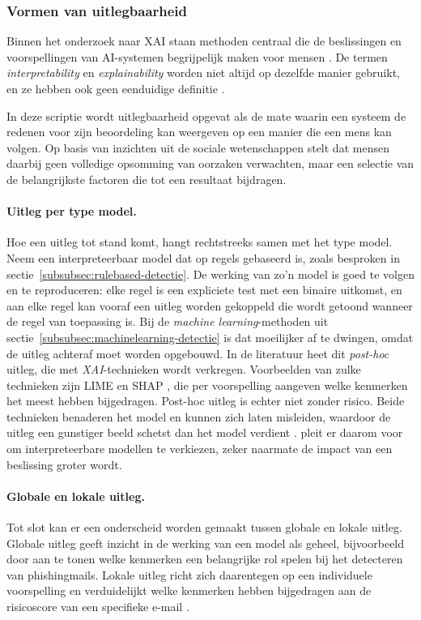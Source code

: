 \subsubsection{Vormen van uitlegbaarheid}
\label{subsubsec:vormen-van-uitlegbaarheid}

Binnen het onderzoek naar XAI staan methoden centraal die de beslissingen en voorspellingen van AI-systemen begrijpelijk maken voor mensen \autocite{Miller2017}. De termen \emph{interpretability} en \emph{explainability} worden niet altijd op dezelfde manier gebruikt, en ze hebben ook geen eenduidige definitie \autocite{Lipton2016}. 

In deze scriptie wordt uitlegbaarheid opgevat als de mate waarin een systeem de redenen voor zijn beoordeling kan weergeven op een manier die een mens kan volgen. Op basis van inzichten uit de sociale wetenschappen stelt \textcite{Miller2017} dat mensen daarbij geen volledige opsomming van oorzaken verwachten, maar een selectie van de belangrijkste factoren die tot een resultaat bijdragen.

\paragraph{Uitleg per type model.}
Hoe een uitleg tot stand komt, hangt rechtstreeks samen met het type model. Neem een interpreteerbaar model dat op regels gebaseerd is, zoals besproken in sectie~\ref{subsubsec:rulebased-detectie}. De werking van zo'n model is goed te volgen en te reproduceren: elke regel is een expliciete test met een binaire uitkomst, en aan elke regel kan vooraf een uitleg worden gekoppeld die wordt getoond wanneer de regel van toepassing is. Bij de \emph{machine learning}-methoden uit sectie~\ref{subsubsec:machinelearning-detectie} is dat moeilijker af te dwingen, omdat de uitleg achteraf moet worden opgebouwd. In de literatuur heet dit \emph{post-hoc} uitleg, die met \emph{XAI}-technieken wordt verkregen.
Voorbeelden van zulke technieken zijn LIME \autocite{Ribeiro2016} en SHAP \autocite{Lundberg2017}, die per voorspelling aangeven welke kenmerken het meest hebben bijgedragen. Post-hoc uitleg is echter niet zonder risico. Beide technieken benaderen het model en kunnen zich laten misleiden, waardoor de uitleg een gunstiger beeld schetst dan het model verdient \autocite{Slack2019}. \textcite{Rudin2019} pleit er daarom voor om interpreteerbare modellen te verkiezen, zeker naarmate de impact van een beslissing groter wordt.

\paragraph{Globale en lokale uitleg.}
Tot slot kan er een onderscheid worden gemaakt tussen globale en lokale uitleg. Globale uitleg geeft inzicht in de werking van een model als geheel, bijvoorbeeld door aan te tonen welke kenmerken een belangrijke rol spelen bij het detecteren van phishingmails. Lokale uitleg richt zich daarentegen op een individuele voorspelling en verduidelijkt welke kenmerken hebben bijgedragen aan de risicoscore van een specifieke e-mail \autocite{Guidotti2018}.